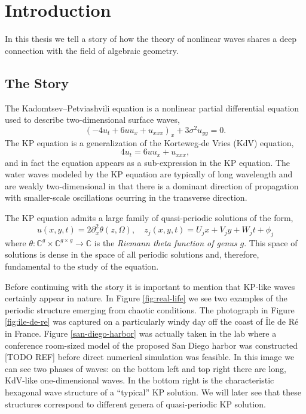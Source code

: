 \chapter{Introduction} \label{ch:Introduction}

In this thesis we tell a story of how the theory of nonlinear waves shares a
deep connection with the field of algebraic geometry.

\section{The Story} \label{sec:the-story}

The Kadomtsev--Petviashvili equation is a nonlinear partial differential
equation used to describe two-dimensional surface waves,
\begin{equation}
  \left( -4u_t + 6uu_x + u_{xxx} \right)_x + 3\sigma^2u_{yy} = 0.
\end{equation}
The KP equation is a generalization of the Korteweg-de Vries (KdV) equation,
\begin{equation}
  4u_t = 6uu_x + u_{xxx},
\end{equation}
and in fact the equation appears as a sub-expression in the KP equation. The
water waves modeled by the KP equation are typically of long wavelength and are
weakly two-dimensional in that there is a dominant direction of propagation with
smaller-scale oscillations ocurring in the transverse direction.

The KP equation admits a large family of quasi-periodic solutions of the form,
\begin{equation}
  u(x,y,t) = 2 \partial_x^2 \theta(z, \Omega),
  \quad
  z_j(x,y,t) = U_jx + V_jy + W_jt + \phi_j
\end{equation}
where $\theta : \mathbb{C}^g \times \mathbb{C}^{g \times g} \to \mathbb{C}$ is
the {\it Riemann theta function of genus $g$}. This space of solutions is dense
in the space of all periodic solutions and, therefore, fundamental to the study
of the equation.

Before continuing with the story it is important to mention that KP-like waves
certainly appear in nature. In Figure \ref{fig:real-life} we see two examples of
the periodic structure emerging from chaotic conditions. The photograph in
Figure \ref{fig:ile-de-re} was captured on a particularly windy day off the
coast of \^{I}le de R\'{e} in France. Figure \ref{san-diego-harbor} was actually
taken in the lab where a conference room-sized model of the proposed San Diego
harbor was constructed [TODO REF] before direct numerical simulation was
feasible. In this image we can see two phases of waves: on the bottom left and
top right there are long, KdV-like one-dimensional waves. In the bottom right is
the characteristic hexagonal wave structure of a ``typical'' KP solution. We
will later see that these structures correspond to different genera of
quasi-periodic KP solution.

